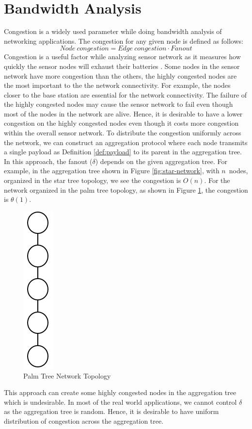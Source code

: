\section{Bandwidth Analysis}
	Congestion is a widely used parameter while doing bandwidth analysis of networking applications.
	The congestion for any given node is defined as follows:
	\begin{equation}\label{def:congestion}
		Node\ congestion = Edge\ congestion \cdot Fanout
	\end{equation}
	Congestion is a useful factor while analyzing sensor network as it measures how quickly the sensor nodes will exhaust their batteries \cite{madden2003design}. 
	Some nodes in the sensor network have more congestion than the others, the highly congested nodes are the most important to the the network connectivity.
	For example, the nodes closer to the base station are essential for the network connectivity.
	The failure of the highly congested nodes may cause the sensor network to fail even though most of the nodes in the network are alive.
	Hence, it is desirable to have a lower congestion on the highly congested nodes even though it costs more congestion within the overall sensor network.
	To distribute the congestion uniformly across the network, we can construct an aggregation protocol where each node transmits a single payload as Definition \ref{def:payload} to its parent in the aggregation tree.
	In this approach, the fanout ($\delta$) depends on the given aggregation tree.
	For example, in the aggregation tree shown in Figure \ref{fig:star-network}, with $n$\ nodes, organized in the star tree topology, we see the congestion is $O(n)$.
	For the network organized in the palm tree topology, as shown in Figure \ref{fig:palm-tree-network}, the congestion is $\theta(1)$.
	\begin{figure}[h!]
		\centering
		\includegraphics[scale = 1]{images/palm-tree.png}
		\caption{Palm Tree Network Topology}
		\label{fig:palm-tree-network}
	\end{figure}
	This approach can create some highly congested nodes in the aggregation tree which is undesirable.
	In most of the real world applications, we cannot control $\delta$ as the aggregation tree is random.
	Hence, it is desirable to have uniform distribution of congestion across the aggregation tree.

